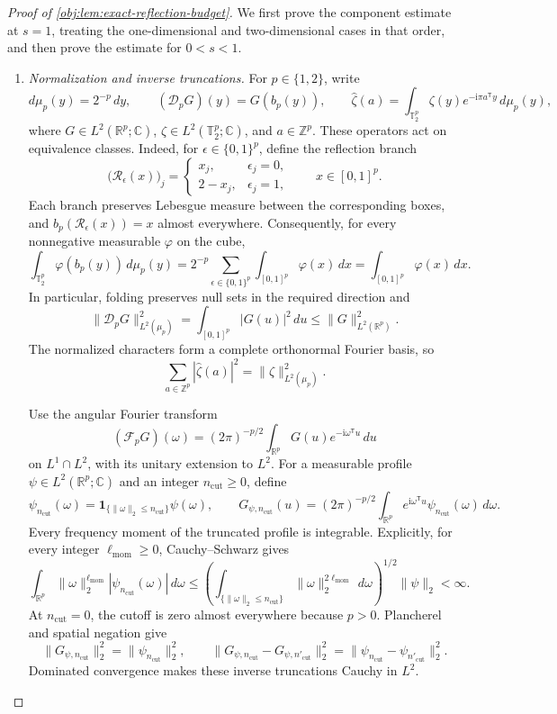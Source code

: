 \begin{proof}[Proof of \cref{obj:lem:exact-reflection-budget}]
We first prove the component estimate at \(s=1\), treating the one-dimensional and two-dimensional cases in that order, and then prove the estimate for \(0<s<1\).

\begin{enumerate}
\item \textit{Normalization and inverse truncations.}
For \(p\in\{1,2\}\), write
\[
d\mu_p(y)=2^{-p}\,dy,
\qquad
(\mathscr D_pG)(y)=G(b_p(y)),
\qquad
\widehat\zeta(a)=
\int_{\mathbb T_2^p}\zeta(y)e^{-\mathrm i\pi a^{\mathsf T}y}\,d\mu_p(y),
\]
where \(G\in L^2(\mathbb R^p;\mathbb C)\), \(\zeta\in L^2(\mathbb T_2^p;\mathbb C)\), and \(a\in\mathbb Z^p\). These operators act on equivalence classes. Indeed, for \(\epsilon\in\{0,1\}^p\), define the reflection branch
\[
\bigl(\mathscr R_\epsilon(x)\bigr)_j
=
\begin{cases}
x_j,&\epsilon_j=0,\\
2-x_j,&\epsilon_j=1,
\end{cases}
\qquad x\in[0,1]^p.
\]
Each branch preserves Lebesgue measure between the corresponding boxes, and
\(b_p(\mathscr R_\epsilon(x))=x\) almost everywhere. Consequently, for every nonnegative measurable \(\varphi\) on the cube,
\[
\int_{\mathbb T_2^p}\varphi(b_p(y))\,d\mu_p(y)
=
2^{-p}\sum_{\epsilon\in\{0,1\}^p}
\int_{[0,1]^p}\varphi(x)\,dx
=
\int_{[0,1]^p}\varphi(x)\,dx.
\]
In particular, folding preserves null sets in the required direction and
\[
\|\mathscr D_pG\|_{L^2(\mu_p)}^2
=
\int_{[0,1]^p}|G(u)|^2\,du
\leq
\|G\|_{L^2(\mathbb R^p)}^2.
\]
The normalized characters form a complete orthonormal Fourier basis, so
\[
\sum_{a\in\mathbb Z^p}|\widehat\zeta(a)|^2
=
\|\zeta\|_{L^2(\mu_p)}^2.
\]

Use the angular Fourier transform
\[
(\mathcal F_pG)(\omega)
=
(2\pi)^{-p/2}
\int_{\mathbb R^p}G(u)e^{-\mathrm i\omega^{\mathsf T}u}\,du
\]
on \(L^1\cap L^2\), with its unitary extension to \(L^2\).
For a measurable profile \(\psi\in L^2(\mathbb R^p;\mathbb C)\) and an integer
\(n_{\mathrm{cut}}\geq0\), define
\[
\psi_{n_{\mathrm{cut}}}(\omega)
=
\mathbf1_{\{\|\omega\|_2\leq n_{\mathrm{cut}}\}}\psi(\omega),
\qquad
G_{\psi,n_{\mathrm{cut}}}(u)
=
(2\pi)^{-p/2}
\int_{\mathbb R^p}
e^{\mathrm i\omega^{\mathsf T}u}
\psi_{n_{\mathrm{cut}}}(\omega)\,d\omega.
\]
Every frequency moment of the truncated profile is integrable. Explicitly, for every integer \(\ell_{\mathrm{mom}}\geq0\), Cauchy--Schwarz gives
\[
\int_{\mathbb R^p}
\|\omega\|_2^{\ell_{\mathrm{mom}}}
|\psi_{n_{\mathrm{cut}}}(\omega)|\,d\omega
\leq
\left(
\int_{\{\|\omega\|_2\leq n_{\mathrm{cut}}\}}
\|\omega\|_2^{2\ell_{\mathrm{mom}}}\,d\omega
\right)^{1/2}
\|\psi\|_2
<\infty.
\]
At \(n_{\mathrm{cut}}=0\), the cutoff is zero almost everywhere because \(p>0\).
Plancherel and spatial negation give
\[
\|G_{\psi,n_{\mathrm{cut}}}\|_2^2
=
\|\psi_{n_{\mathrm{cut}}}\|_2^2,
\qquad
\|G_{\psi,n_{\mathrm{cut}}}-G_{\psi,n'_{\mathrm{cut}}}\|_2^2
=
\|\psi_{n_{\mathrm{cut}}}-\psi_{n'_{\mathrm{cut}}}\|_2^2.
\]
Dominated convergence makes these inverse truncations Cauchy in \(L^2\).


\end{enumerate}
\end{proof}
